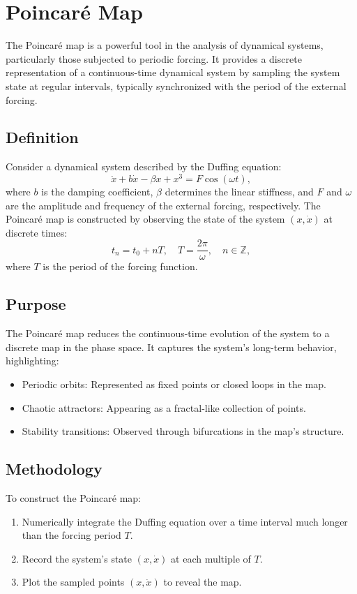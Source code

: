\documentclass[11pt]{article}
\begin{document}
\section*{Poincaré Map}
The Poincaré map is a powerful tool in the analysis of dynamical systems, particularly those subjected to periodic forcing. It provides a discrete representation of a continuous-time dynamical system by sampling the system state at regular intervals, typically synchronized with the period of the external forcing.

\subsection*{Definition}
Consider a dynamical system described by the Duffing equation:
\[
\ddot{x} + b \dot{x} - \beta x + x^3 = F \cos(\omega t),
\]
where \(b\) is the damping coefficient, \(\beta\) determines the linear stiffness, and \(F\) and \(\omega\) are the amplitude and frequency of the external forcing, respectively. The Poincaré map is constructed by observing the state of the system \((x, \dot{x})\) at discrete times:
\[
t_n = t_0 + nT, \quad T = \frac{2\pi}{\omega}, \quad n \in \mathbb{Z},
\]
where \(T\) is the period of the forcing function.

\subsection*{Purpose}
The Poincaré map reduces the continuous-time evolution of the system to a discrete map in the phase space. It captures the system's long-term behavior, highlighting:
\begin{itemize}
    \item Periodic orbits: Represented as fixed points or closed loops in the map.
    \item Chaotic attractors: Appearing as a fractal-like collection of points.
    \item Stability transitions: Observed through bifurcations in the map's structure.
\end{itemize}

\subsection*{Methodology}
To construct the Poincaré map:
\begin{enumerate}
    \item Numerically integrate the Duffing equation over a time interval much longer than the forcing period \(T\).
    \item Record the system's state \((x, \dot{x})\) at each multiple of \(T\).
    \item Plot the sampled points \((x, \dot{x})\) to reveal the map.
\end{enumerate}
\end{document}
